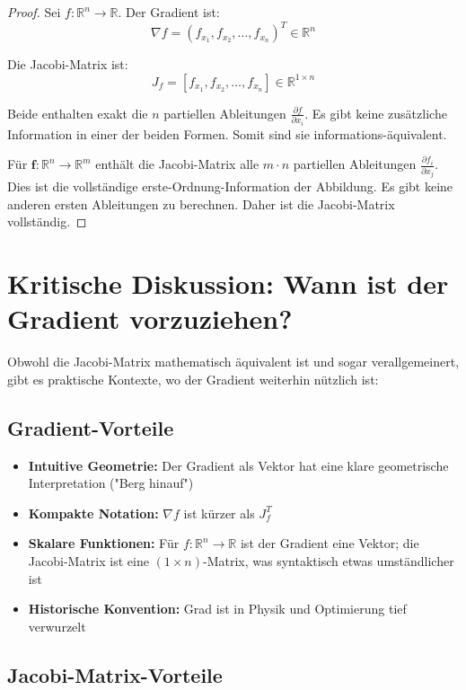 ﻿\documentclass[a4paper,12pt]{article}
\theoremstyle{definition}
\begin{document}
\begin{proof}
	Sei $f: \mathbb{R}^n \to \mathbb{R}$. Der Gradient ist:
	\[
	\nabla f = (f_{x_1}, f_{x_2}, \ldots, f_{x_n})^T \in \mathbb{R}^n
	\]
	
	Die Jacobi-Matrix ist:
	\[
	J_f = [f_{x_1}, f_{x_2}, \ldots, f_{x_n}] \in \mathbb{R}^{1 \times n}
	\]
	
	Beide enthalten exakt die $n$ partiellen Ableitungen $\frac{\partial f}{\partial x_i}$. Es gibt keine zusätzliche Information in einer der beiden Formen. Somit sind sie informations-äquivalent.
	
	Für $\boldsymbol{f}: \mathbb{R}^n \to \mathbb{R}^m$ enthält die Jacobi-Matrix alle $m \cdot n$ partiellen Ableitungen $\frac{\partial f_i}{\partial x_j}$. Dies ist die vollständige erste-Ordnung-Information der Abbildung. Es gibt keine anderen ersten Ableitungen zu berechnen. Daher ist die Jacobi-Matrix vollständig.
\end{proof}

\newpage

\section{Kritische Diskussion: Wann ist der Gradient vorzuziehen?}

Obwohl die Jacobi-Matrix mathematisch äquivalent ist und sogar verallgemeinert, gibt es praktische Kontexte, wo der Gradient weiterhin nützlich ist:

\subsection{Gradient-Vorteile}

\begin{itemize}
	\item \textbf{Intuitive Geometrie:} Der Gradient als Vektor hat eine klare geometrische Interpretation ("Berg hinauf")
	\item \textbf{Kompakte Notation:} $\nabla f$ ist kürzer als $J_f^T$
	\item \textbf{Skalare Funktionen:} Für $f: \mathbb{R}^n \to \mathbb{R}$ ist der Gradient eine Vektor; die Jacobi-Matrix ist eine $(1 \times n)$-Matrix, was syntaktisch etwas umständlicher ist
	\item \textbf{Historische Konvention:} Grad ist in Physik und Optimierung tief verwurzelt
\end{itemize}

\subsection{Jacobi-Matrix-Vorteile}
\end{document}
